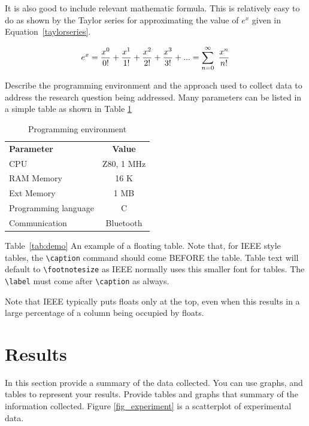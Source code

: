 \documentclass[journal,12pt]{IEEEtran}
\begin{document}
It is also good to include relevant mathematic formula. This is relatively easy to do as shown by the Taylor series for approximating the value of $e^x$ given in Equation~\ref{taylorseries}.

\begin{equation}
\label{taylorseries}
e^x = {x^0\over 0!} + {x^1\over 1!} + {x^2\over 2!} +{x^3\over 3!} + ...= \sum^\infty_{n=0}\ {x^n\over n!}
\end{equation}

Describe the programming environment and the approach used to collect data to address the research question being addressed.
Many parameters can be listed in a simple table as shown in  Table \ref{progenv}

\begin{table}[htb]
\centering
\caption{Programming environment}
\medskip
\label{progenv}
\begin{tabular}{lc}
\textbf{Parameter} & \textbf{Value}\\
CPU & Z80, 1 MHz\\
RAM Memory & 16 K\\
Ext Memory & 1 MB\\
Programming language & C \\
Communication& Bluetooth \\
\end{tabular}
\end{table}

Table~\ref{tab:demo} An example of a floating table. Note that, for IEEE style tables, the 
\verb|\caption| command should come BEFORE the table. Table text will default to
\verb|\footnotesize| as IEEE normally uses this smaller font for tables.
The \verb|\label| must come after \verb|\caption| as always.

Note that IEEE typically puts floats only at the top, even when this
results in a large percentage of a column being occupied by floats.

\section{Results}
\label{sec:results}

In this section provide a summary of the data collected. You can use graphs, and tables to represent your results.
Provide tables and graphs that summary of the information collected. Figure \ref{fig_experiment}
is a scatterplot of experimental data. 
\end{document}
